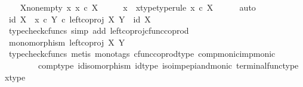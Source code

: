 \begin{isabellebody}
\ \ \isamarkupfalse%
\ X{\isacharunderscore}{\kern0pt}nonempty{\isacharcolon}{\kern0pt}\ {\isachardoublequoteopen}{\isasymexists}x{\isachardot}{\kern0pt}\ x\ {\isasymin}\isactrlsub c\ X{\isachardoublequoteclose}\isanewline
\ \ \isamarkupfalse%
\ \isamarkupfalse%
\ x\ \ x{\isacharunderscore}{\kern0pt}type{\isacharbrackleft}{\kern0pt}type{\isacharunderscore}{\kern0pt}rule{\isacharbrackright}{\kern0pt}{\isacharcolon}{\kern0pt}\ {\isachardoublequoteopen}x\ {\isasymin}\isactrlsub c\ X{\isachardoublequoteclose}\isanewline
\ \ \ \ \isamarkupfalse%
\ auto\isanewline
\ \ \isamarkupfalse%
\ \isamarkupfalse%
\ {\isachardoublequoteopen}{\isacharparenleft}{\kern0pt}id\ X\ {\isasymamalg}\ {\isacharparenleft}{\kern0pt}x\ {\isasymcirc}\isactrlsub c\ {\isasymbeta}\isactrlbsub Y\isactrlesub {\isacharparenright}{\kern0pt}{\isacharparenright}{\kern0pt}\ {\isasymcirc}\isactrlsub c\ left{\isacharunderscore}{\kern0pt}coproj\ X\ Y\ {\isacharequal}{\kern0pt}\ id\ X{\isachardoublequoteclose}\isanewline
\ \ \ \ \isamarkupfalse%
\ {\isacharparenleft}{\kern0pt}typecheck{\isacharunderscore}{\kern0pt}cfuncs{\isacharcomma}{\kern0pt}\ simp\ add{\isacharcolon}{\kern0pt}\ left{\isacharunderscore}{\kern0pt}coproj{\isacharunderscore}{\kern0pt}cfunc{\isacharunderscore}{\kern0pt}coprod{\isacharparenright}{\kern0pt}\isanewline
\ \ \isamarkupfalse%
\ \isamarkupfalse%
\ {\isachardoublequoteopen}monomorphism\ {\isacharparenleft}{\kern0pt}left{\isacharunderscore}{\kern0pt}coproj\ X\ Y{\isacharparenright}{\kern0pt}{\isachardoublequoteclose}\isanewline
\ \ \ \ \isamarkupfalse%
\ {\isacharparenleft}{\kern0pt}typecheck{\isacharunderscore}{\kern0pt}cfuncs{\isacharcomma}{\kern0pt}\ metis\ {\isacharparenleft}{\kern0pt}mono{\isacharunderscore}{\kern0pt}tags{\isacharparenright}{\kern0pt}\ cfunc{\isacharunderscore}{\kern0pt}coprod{\isacharunderscore}{\kern0pt}type\ comp{\isacharunderscore}{\kern0pt}monic{\isacharunderscore}{\kern0pt}imp{\isacharunderscore}{\kern0pt}monic{\isacharprime}{\kern0pt}\isanewline
\ \ \ \ \ \ \ \ comp{\isacharunderscore}{\kern0pt}type\ id{\isacharunderscore}{\kern0pt}isomorphism\ id{\isacharunderscore}{\kern0pt}type\ iso{\isacharunderscore}{\kern0pt}imp{\isacharunderscore}{\kern0pt}epi{\isacharunderscore}{\kern0pt}and{\isacharunderscore}{\kern0pt}monic\ terminal{\isacharunderscore}{\kern0pt}func{\isacharunderscore}{\kern0pt}type\ x{\isacharunderscore}{\kern0pt}type{\isacharparenright}{\kern0pt}\isanewline

\end{isabellebody}
